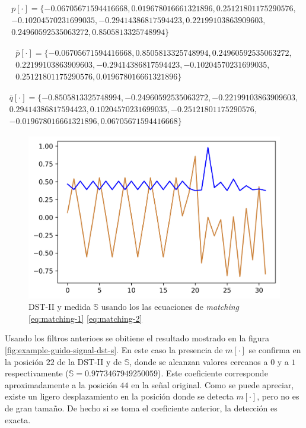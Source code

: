 $$
	\begin{array}{lcl}
		p[\cdot] = \{ -0.06705671594416668, 0.019678016661321896, 0.25121801175290576,\\ 
			-0.10204570231699035, -0.29414386817594423, 0.22199103863909603, \\ 
			0.24960592535063272, 0.8505813325748994\}
	\end{array}
$$

$$
	\begin{array}{lcl}
		\bar p[\cdot] = \{ -0.06705671594416668, 0.8505813325748994, 0.24960592535063272,\\ 
			0.22199103863909603, -0.29414386817594423, -0.10204570231699035,\\ 
		0.25121801175290576, 0.019678016661321896 \}
	\end{array}
$$

$$
	\begin{array}{lcl}
		\bar q[\cdot] = \{ -0.8505813325748994, -0.24960592535063272, -0.22199103863909603,\\
			0.29414386817594423, 0.10204570231699035, -0.25121801175290576, \\ 
		-0.019678016661321896, 0.06705671594416668 \}
	\end{array}
$$

\begin{figure} 
	\centering
	\includegraphics[scale=0.8]{Graphics/example-guido-signal-dst-s.png}
	\caption{DST-II y medida $\mathbb{S}$ usando los las ecuaciones de \textit{matching} \ref{eq:matching-1} \ref{eq:matching-2}} \label{fig:example-guido-signal}
\end{figure}

Usando los filtros anterioes se obitiene el resultado mostrado en la figura \ref{fig:example-guido-signal-dst-s}. 
En este caso la presencia de $m[\cdot]$ se confirma en la posición $22$ de la DST-II y de $\mathbb{S}$, donde se alcanzan valores
cercanos a $0$ y a $1$ respectivamente ($\mathbb{S}=0.9773467949250059$). Este coeficiente corresponde aproximadamente a la posición 
$44$ en la señal original. Como se puede apreciar, existe un ligero desplazamiento en la posición donde se detecta $m[\cdot]$,
pero no es de gran tamaño. De hecho si se toma el coeficiente anterior, la detección es exacta.

